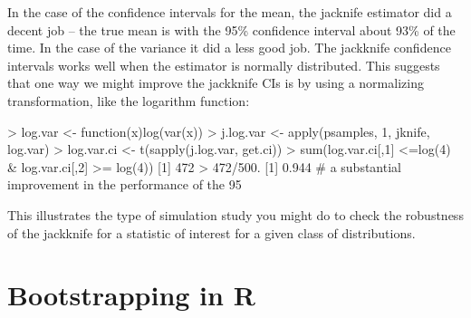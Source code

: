 

In the case  of the confidence intervals for the mean, the jacknife estimator did a decent job -- the true mean is with the 95\% confidence interval about 93\% of the time.  In the case of the variance it did a less good job.  The jackknife confidence intervals works well when the estimator is normally distributed. This suggests that one way we might improve the jackknife CIs is by using a normalizing transformation, like the logarithm function:

\begin{R}
> log.var <- function(x){log(var(x))}    
> j.log.var <- apply(psamples, 1, jknife, log.var)
> log.var.ci <- t(sapply(j.log.var, get.ci))
> sum(log.var.ci[,1] <=log(4) & log.var.ci[,2] >= log(4))
[1] 472
> 472/500.
[1] 0.944   
# a substantial improvement in the performance of the 95%
\end{R}

This illustrates the type of simulation study you might do to check the robustness of the jackknife for a statistic of interest for a given class of distributions.

\section{Bootstrapping in R}

